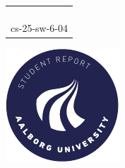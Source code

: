 \begin{titlepage}
{{\begin{tabular}{@{}p{\textwidth}@{}}
\begin{center}
{      }
    \end{center}
    \vspace{0.2cm}
   \begin{center}
    {\Large
      Adam Kuzniewski, \linebreak Emil S. Doganci, \linebreak Mathias M. Larsen%
    }\\
    \vspace{0.2cm}
    {\large
      cs-25-sw-6-04%
    }
   \end{center}
   \vspace{0.2cm}
   \begin{center}
    {\Large
      Bachelor's Project
    }
   \end{center}
  \end{tabular}}}
  \vfill
  \begin{center}
    \includegraphics[width=0.2\paperwidth]{7. Figures/AAU logo cirkel.pdf}
  \end{center}
\end{titlepage}
\clearpage
